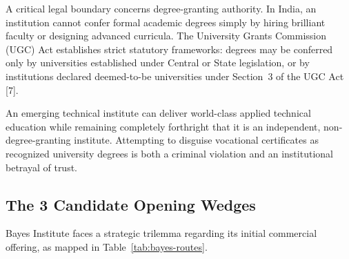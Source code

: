 A critical legal boundary concerns degree-granting authority. In India, an institution cannot confer formal academic degrees simply by hiring brilliant faculty or designing advanced curricula. The University Grants Commission (UGC) Act establishes strict statutory frameworks: degrees may be conferred only by universities established under Central or State legislation, or by institutions declared deemed-to-be universities under Section~3 of the UGC Act [7].

An emerging technical institute can deliver world-class applied technical education while remaining completely forthright that it is an independent, non-degree-granting institute. Attempting to disguise vocational certificates as recognized university degrees is both a criminal violation and an institutional betrayal of trust.

\subsection{The 3 Candidate Opening Wedges}

Bayes Institute faces a strategic trilemma regarding its initial commercial offering, as mapped in Table~\ref{tab:bayes-routes}.

